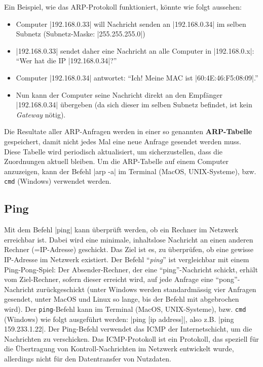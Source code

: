 Ein Beispiel, wie das \gls{ARP}-Protokoll funktioniert, könnte wie folgt aussehen:
\begin{itemize}
	\item Computer \commandbox|192.168.0.33| will Nachricht senden an \commandbox|192.168.0.34| im selben Subnetz (Subnetz-Maske: \commandBluebox|255.255.255.0|)
	\item \commandbox|192.168.0.33| sendet daher eine Nachricht an alle Computer in \commandbox|192.168.0.x|: \enquote{Wer hat die \gls{IP} \commandbox|192.168.0.34|?}
	\item Computer \commandbox|192.168.0.34| antwortet: \enquote{Ich! Meine \gls{MAC} ist \commandbox|60:4E:46:F5:08:09|.}
	\item Nun kann der Computer seine Nachricht direkt an den Empfänger \commandbox|192.168.0.34| übergeben (da sich dieser im selben Subnetz befindet, ist kein \textit{Gateway} nötig).
\end{itemize}

Die Resultate aller \gls{ARP}-Anfragen werden in einer so genannten \textbf{ARP-Tabelle} gespeichert, damit nicht jedes Mal eine neue Anfrage gesendet werden muss. Diese Tabelle wird periodisch aktualisiert, um sicherzustellen, dass die Zuordnungen aktuell bleiben. Um die \gls{ARP}-Tabelle auf einem Computer anzuzeigen, kann der Befehl \commandbox*|arp -a| im Terminal (MacOS, UNIX-Systeme), bzw. \texttt{cmd} (Windows) verwendet werden.

\subsection{Ping}
Mit dem Befehl \commandbox*|ping| kann überprüft werden, ob ein Rechner im Netzwerk erreichbar ist. Dabei wird eine minimale, inhaltslose Nachricht an einen anderen Rechner (=\gls{IP}-Adresse) geschickt. Das Ziel ist es, zu überprüfen, ob eine gewisse \gls{IP}-Adresse im Netzwerk existiert. Der Befehl \enquote{\textit{ping}} ist vergleichbar mit einem Ping-Pong-Spiel: Der Absender-Rechner, der eine \enquote{ping}-Nachricht schickt, erhält vom Ziel-Rechner, sofern dieser erreicht wird, auf jede Anfrage eine \enquote{pong}-Nachricht zurückgeschickt (unter Windows werden standardmässig vier Anfragen gesendet, unter MacOS und Linux so lange, bis der Befehl mit  abgebrochen wird). Der \texttt{ping}-Befehl kann im Terminal (MacOS, UNIX-Systeme), bzw. \texttt{cmd} (Windows) wie folgt ausgeführt werden: \commandbox*|ping [ip address]|, also z.B. \commandbox*|ping 159.233.1.22|. Der Ping-Befehl verwendet das \gls{ICMP} der Internetschicht, um die Nachrichten zu verschicken. Das \gls{ICMP}-Protokoll ist ein Protokoll, das speziell für die Übertragung von Kontroll-Nachrichten im Netzwerk entwickelt wurde, allerdings nicht für den Datentransfer von Nutzdaten.

